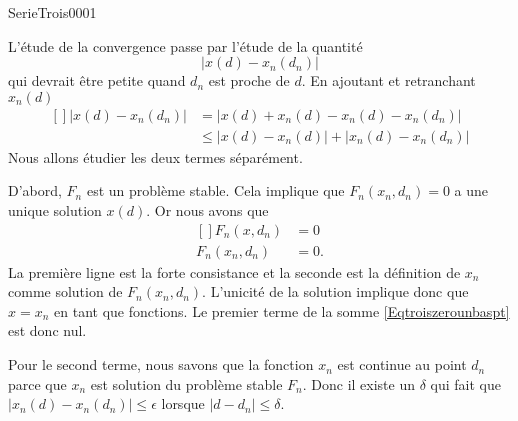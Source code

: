 
\begin{corrige}{SerieTrois0001}

	L'étude de la convergence passe par l'étude de la quantité
	\begin{equation}
		| x(d)-x_n(d_n) |
	\end{equation}
	qui devrait être petite quand $d_n$ est proche de $d$. En ajoutant et retranchant $x_n(d)$
	\begin{equation}		\label{Eqtroiszerounbaspt}
		\begin{aligned}[]
			| x(d)-x_n(d_n) |&=\big| x(d)+x_n(d)-x_n(d)-x_n(d_n) \big|\\
				&\leq \big| x(d)-x_n(d) \big|+\big| x_n(d)-x_n(d_n) \big|
		\end{aligned}
	\end{equation}
	Nous allons étudier les deux termes séparément.

	D'abord, $F_n$ est un problème stable. Cela implique que $F_n(x_n,d_n)=0$ a une unique solution $x(d)$. Or nous avons que
	\begin{equation}
		\begin{aligned}[]
			F_n(x,d_n)&=0\\
			F_n(x_n,d_n)&=0.
		\end{aligned}
	\end{equation}
	La première ligne est la forte consistance et la seconde est la définition de $x_n$ comme solution de $F_n(x_n,d_n)$. L'unicité de la solution implique donc que $x=x_n$ en tant que fonctions. Le premier terme de la somme \eqref{Eqtroiszerounbaspt} est donc nul.

	Pour le second terme, nous savons que la fonction $x_n$ est continue au point $d_n$ parce que $x_n$ est solution du problème stable $F_n$. Donc il existe un $\delta$ qui fait que $\big| x_n(d)-x_n(d_n) \big|\leq \epsilon$ lorsque $| d-d_n |\leq \delta$.
	
\end{corrige}
